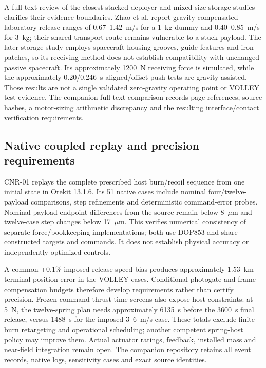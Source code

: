 \documentclass[conference]{IEEEtran}
\begin{document}
A full-text review of the closest stacked-deployer and mixed-size storage studies clarifies their evidence boundaries. Zhao et al.\cite{stacked2022} report gravity-compensated laboratory release ranges of 0.67--1.42~m/s for a 1~kg dummy and 0.40--0.85~m/s for 3~kg; their shared transport route remains vulnerable to a stuck payload. The later storage study\cite{storage2025} employs spacecraft housing grooves, guide features and iron patches, so its receiving method does not establish compatibility with unchanged passive spacecraft. Its approximately 1200~N receiving force is simulated, while the approximately 0.20/0.246~s aligned/offset push tests are gravity-assisted. Those results are not a single validated zero-gravity operating point or VOLLEY test evidence. The companion full-text comparison records page references, source hashes, a motor-sizing arithmetic discrepancy and the resulting interface/contact verification requirements.


\subsection{Native coupled replay and precision requirements}
CNR-01 replays the complete prescribed host burn/recoil sequence from one initial state in Orekit 13.1.6. Its 51 native cases include nominal four/twelve-payload comparisons, step refinements and deterministic command-error probes. Nominal payload endpoint differences from the source remain below 8~$\mu$m and twelve-case step changes below 17~$\mu$m. This verifies numerical consistency of separate force/bookkeeping implementations; both use DOP853 and share constructed targets and commands. It does not establish physical accuracy or independently optimized controls.

A common +0.1\% imposed release-speed bias produces approximately 1.53~km terminal position error in the VOLLEY cases. Conditional photogate and frame-compensation budgets therefore develop requirements rather than certify precision. Frozen-command thrust-time screens also expose host constraints: at 5~N, the twelve-spring plan needs approximately 6135~s before the 3600~s final release, versus 1488~s for the imposed 3--6~m/s case. These totals exclude finite-burn retargeting and operational scheduling; another competent spring-host policy may improve them. Actual actuator ratings, feedback, installed mass and near-field integration remain open. The companion repository retains all event records, native logs, sensitivity cases and exact source identities.
\end{document}
